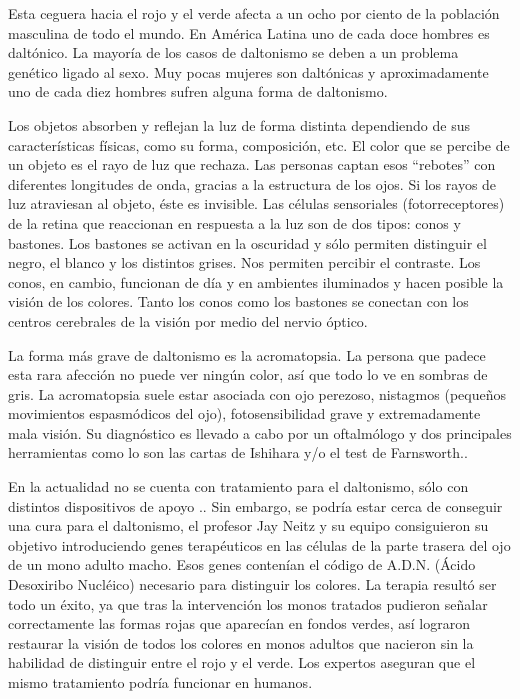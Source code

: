 \documentclass[10pt]{article}
\begin{document}
\setlength{\parskip}{2mm}

Esta ceguera hacia el rojo y el verde afecta a un ocho por ciento de la población masculina de todo el mundo. En América Latina uno de cada doce hombres es daltónico. La mayoría de los casos de daltonismo se deben a un problema genético ligado al sexo. Muy pocas mujeres son daltónicas y aproximadamente uno de cada diez hombres sufren alguna forma de daltonismo.

\setlength{\parskip}{2mm}

Los objetos absorben y reflejan la luz de forma distinta dependiendo de sus características físicas, como su forma, composición, etc. El color que se percibe de un objeto es el rayo de luz que rechaza. Las personas captan esos “rebotes” con diferentes longitudes de onda, gracias a la estructura de los ojos. Si los rayos de luz atraviesan al objeto, éste es invisible. Las células sensoriales (fotorreceptores) de la retina que reaccionan en respuesta a la luz son de dos tipos: conos y bastones. Los bastones se activan en la oscuridad y sólo permiten distinguir el negro, el blanco y los distintos grises. Nos permiten percibir el contraste. Los conos, en cambio, funcionan de día y en ambientes iluminados y hacen posible la visión de los colores. Tanto los conos como los bastones se conectan con los centros cerebrales de la visión por medio del nervio óptico.

\setlength{\parskip}{2mm}

La forma más grave de daltonismo es la acromatopsia. La persona que padece esta rara afección no puede ver ningún color, así que todo lo ve en sombras de gris. La acromatopsia suele estar asociada con ojo perezoso, nistagmos (pequeños movimientos espasmódicos del ojo), fotosensibilidad grave y extremadamente mala visión. Su diagnóstico es llevado a cabo por un oftalmólogo y dos principales herramientas como lo son las cartas de Ishihara y/o el test de Farnsworth\cite{IEEEreferencias:Ref3}..

\setlength{\parskip}{2mm}

En la actualidad no se cuenta con tratamiento para el daltonismo, sólo con distintos dispositivos de apoyo \cite{IEEEreferencias:Ref1}.. Sin embargo, se podría estar cerca de conseguir una cura para el daltonismo, el profesor Jay Neitz y su equipo consiguieron su objetivo introduciendo genes terapéuticos en las células de la parte trasera del ojo de un mono adulto macho. Esos genes contenían el código de A.D.N. (Ácido Desoxiribo Nucléico) necesario para distinguir los colores. La terapia resultó ser todo un éxito, ya que tras la intervención los monos tratados pudieron señalar correctamente las formas rojas que aparecían en fondos verdes, así lograron restaurar la visión de todos los colores en monos adultos que nacieron sin la habilidad de distinguir entre el rojo y el verde. Los expertos aseguran que el mismo tratamiento podría funcionar en humanos\cite{IEEEreferencias:Ref4}.
\newpage
\end{document}
